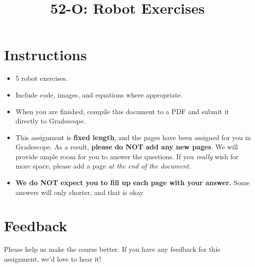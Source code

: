 \date{}

\title{\vspace{-1cm}52-O: Robot Exercises}



\maketitle
\vspace{-3cm}
\thispagestyle{fancy}

\section*{Instructions}
\begin{itemize}
  \item 5 robot exercises.
  \item Include code, images, and equations where appropriate.
  \item When you are finished, compile this document to a PDF and submit it directly to Gradescope. 
  \item This assignment is \textbf{fixed length}, and the pages have been assigned for you in Gradescope. As a result, \textbf{please do NOT add any new pages}. We will provide ample room for you to answer the questions. If you \emph{really} wish for more space, please add a page \emph{at the end of the document}.
  \item \textbf{We do NOT expect you to fill up each page with your answer.} Some answers will only shorter, and that is okay.
\end{itemize}
\pagebreak







\pagebreak
\section*{Feedback}
Please help us make the course better. If you have any feedback for this assignment, we'd love to hear it!


